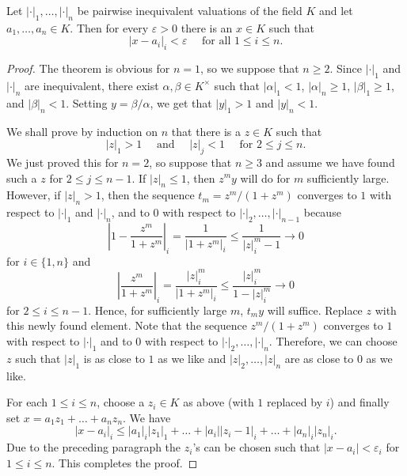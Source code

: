 \begin{theorem}
    Let $|\cdot|_1,\dots,|\cdot|_n$ be pairwise inequivalent valuations of the field $K$ and let $a_1,\dots,a_n\in K$. Then for every $\varepsilon > 0$ there is an $x\in K$ such that 
    \begin{equation*}
        |x - a_i|_i < \varepsilon\quad\text{ for all } 1\le i\le n.
    \end{equation*}
\end{theorem}
\begin{proof}
    The theorem is obvious for $n = 1$, so we suppose that $n\ge 2$. Since $|\cdot|_1$ and $|\cdot|_n$ are inequivalent, there exist $\alpha,\beta\in K^\times$ such that $|\alpha|_1 < 1$, $|\alpha|_n\ge 1$, $|\beta|_1\ge 1$, and $|\beta|_n < 1$. Setting $y = \beta/\alpha$, we get that $|y|_1 > 1$ and $|y|_n < 1$. 

    We shall prove by induction on $n$ that there is a $z\in K$ such that 
    \begin{equation*}
        |z|_1 > 1\quad\text{ and }\quad |z|_j < 1\quad\text{ for } 2\le j\le n.
    \end{equation*}
    We just proved this for $n = 2$, so suppose that $n\ge 3$ and assume we have found such a $z$ for $2\le j\le n - 1$. If $|z|_n\le 1$, then $z^my$ will do for $m$ sufficiently large. However, if $|z|_n > 1$, then the sequence $t_m = z^m/(1 + z^m)$ converges to $1$ with respect to $|\cdot|_1$ and $|\cdot|_n$, and to $0$ with respect to $|\cdot|_2,\dots,|\cdot|_{n - 1}$ because 
    \begin{equation*}
        \left|1 - \frac{z^m}{1 + z^m}\right|_i = \frac{1}{|1 + z^m|_i}\le\frac{1}{|z|_i^m - 1}\to 0
    \end{equation*}
    for $i\in\{1, n\}$ and 
    \begin{equation*}
        \left|\frac{z^m}{1 + z^m}\right|_i = \frac{|z|_i^m}{|1 + z^m|_i}\le\frac{|z|_i^m}{1 - |z|_i^m}\to 0
    \end{equation*}
    for $2\le i\le n - 1$. Hence, for sufficiently large $m$, $t_my$ will suffice. Replace $z$ with this newly found element. Note that the sequence $z^m/(1 + z^m)$ converges to $1$ with respect to $|\cdot|_1$ and to $0$ with respect to $|\cdot|_2,\dots, |\cdot|_n$. Therefore, we can choose $z$ such that $|z|_1$ is as close to $1$ as we like and $|z|_2,\dots,|z|_n$ are as close to $0$ as we like.

    For each $1\le i\le n$, choose a $z_i\in K$ as above (with $1$ replaced by $i$) and finally set $x = a_1z_1 + \dots + a_nz_n$. We have 
    \begin{equation*}
        |x - a_i|_i\le |a_1|_i|z_1|_1 + \dots + |a_i||z_i - 1|_i + \dots + |a_n|_i|z_n|_i.
    \end{equation*}
    Due to the preceding paragraph the $z_i$'s can be chosen such that $|x - a_i| < \varepsilon_i$ for $1\le i\le n$. This completes the proof.
\end{proof}

